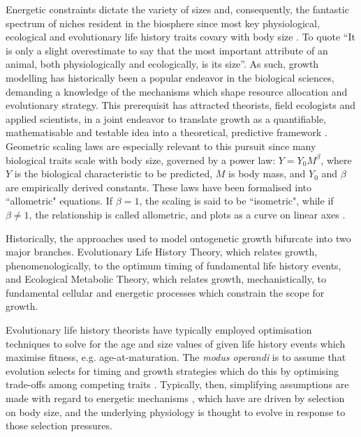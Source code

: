 \documentclass[a4paper]{article} %
\begin{document}
    Energetic constraints dictate the variety of sizes and, consequently, the fantastic spectrum of niches resident in the biosphere since most key physiological, ecological and evolutionary life history traits covary with body size \autocite{peters1983, brown2000-scaling-book,schmidt1984scaling,Marshall2019b}. To quote \cite{Bartholomew1981} ``It is only a slight overestimate to say that the most important attribute of an animal, both physiologically and ecologically, is its size''. As such, growth modelling has historically been a popular endeavor in the biological sciences, demanding a knowledge of the mechanisms which shape resource allocation and evolutionary strategy. This prerequisit has attracted theorists, field ecologists and applied scientists, in a joint endeavor to translate growth as a quantifiable, mathematisable and testable idea into a theoretical, predictive framework \autocite{popper1962,popper1972,peters1983, West2011}. Geometric scaling laws are especially relevant to this pursuit since many biological traits scale with body size, governed by a power law: $Y = Y_0 M^{\beta}$, where $Y$ is the biological characteristic to be predicted, $M$ is body mass, and $Y_0$ and $\beta$ are empirically derived constants. These laws have been formalised into ``allometric" equations. If $\beta = 1$, the scaling is said to be ``isometric", while if $\beta \neq 1$, the relationship is called allometric, and plots as a curve on linear axes \autocite{brown2000-scaling-book}.

    Historically, the approaches used to model ontogenetic growth bifurcate into two major branches. Evolutionary Life History Theory, which relates growth, phenomenologically, to the optimum timing of fundamental life history events, and Ecological Metabolic Theory, which relates growth, mechanistically, to fundamental cellular and energetic processes which constrain the scope for growth.
        
    Evolutionary life history theorists have typically employed optimisation techniques to solve for the age and size values of given life history events which maximise fitness, e.g. age-at-maturation. The \textit{modus operandi} is to assume that evolution selects for timing and growth strategies which do this by optimising trade-offs among competing traits \autocite{Day1997, Stearns1989, stearns1992evolution}. Typically, then, simplifying assumptions are made with regard to energetic mechanisms \autocite{Day1997, Kozowski1987-indeterminate}, which have are driven by selection on body size, and the underlying physiology is thought to evolve in response to those selection pressures.
        
\end{document}
